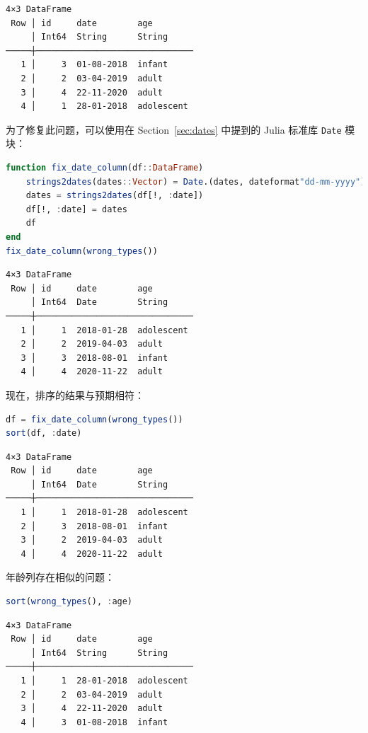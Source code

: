 \documentclass[
  notoc %
]{tufte-book}
\newcommand{\passthrough}[1]{#1}
\begin{document}
\begin{lstlisting}[language=Output]
4×3 DataFrame
 Row │ id     date        age
     │ Int64  String      String
─────┼───────────────────────────────
   1 │     3  01-08-2018  infant
   2 │     2  03-04-2019  adult
   3 │     4  22-11-2020  adult
   4 │     1  28-01-2018  adolescent
\end{lstlisting}

为了修复此问题，可以使用在 Section~\ref{sec:dates} 中提到的 Julia 标准库
\passthrough{\lstinline!Date!} 模块：

\begin{lstlisting}[language=Julia]
function fix_date_column(df::DataFrame)
    strings2dates(dates::Vector) = Date.(dates, dateformat"dd-mm-yyyy")
    dates = strings2dates(df[!, :date])
    df[!, :date] = dates
    df
end
fix_date_column(wrong_types())
\end{lstlisting}

\begin{lstlisting}[language=Output]
4×3 DataFrame
 Row │ id     date        age
     │ Int64  Date        String
─────┼───────────────────────────────
   1 │     1  2018-01-28  adolescent
   2 │     2  2019-04-03  adult
   3 │     3  2018-08-01  infant
   4 │     4  2020-11-22  adult
\end{lstlisting}

现在，排序的结果与预期相符：

\begin{lstlisting}[language=Julia]
df = fix_date_column(wrong_types())
sort(df, :date)
\end{lstlisting}

\begin{lstlisting}[language=Output]
4×3 DataFrame
 Row │ id     date        age
     │ Int64  Date        String
─────┼───────────────────────────────
   1 │     1  2018-01-28  adolescent
   2 │     3  2018-08-01  infant
   3 │     2  2019-04-03  adult
   4 │     4  2020-11-22  adult
\end{lstlisting}

年龄列存在相似的问题：

\begin{lstlisting}[language=Julia]
sort(wrong_types(), :age)
\end{lstlisting}

\begin{lstlisting}[language=Output]
4×3 DataFrame
 Row │ id     date        age
     │ Int64  String      String
─────┼───────────────────────────────
   1 │     1  28-01-2018  adolescent
   2 │     2  03-04-2019  adult
   3 │     4  22-11-2020  adult
   4 │     3  01-08-2018  infant
\end{lstlisting}
\end{document}
